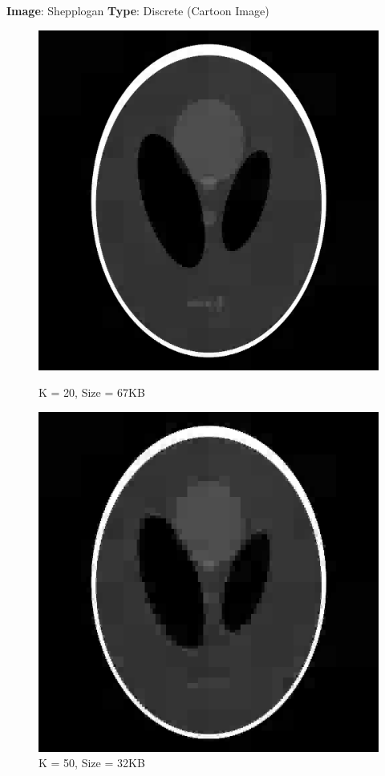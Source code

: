 \documentclass{article}
\begin{document}
    \pagebreak
    \textbf{Image}: Shepplogan  \textbf{Type}: Discrete (Cartoon Image)\\
    \begin{figure}[!htb]
      \includegraphics[scale=0.4]{./compression/2/20.png}
      \caption{K = 20, Size = 67KB}
    \endminipage \hfill
      \includegraphics[scale=.4]{./compression/2/50.png}
      \caption{K = 50, Size = 32KB}
    \endminipage
    \end{figure}
    
\end{document}
